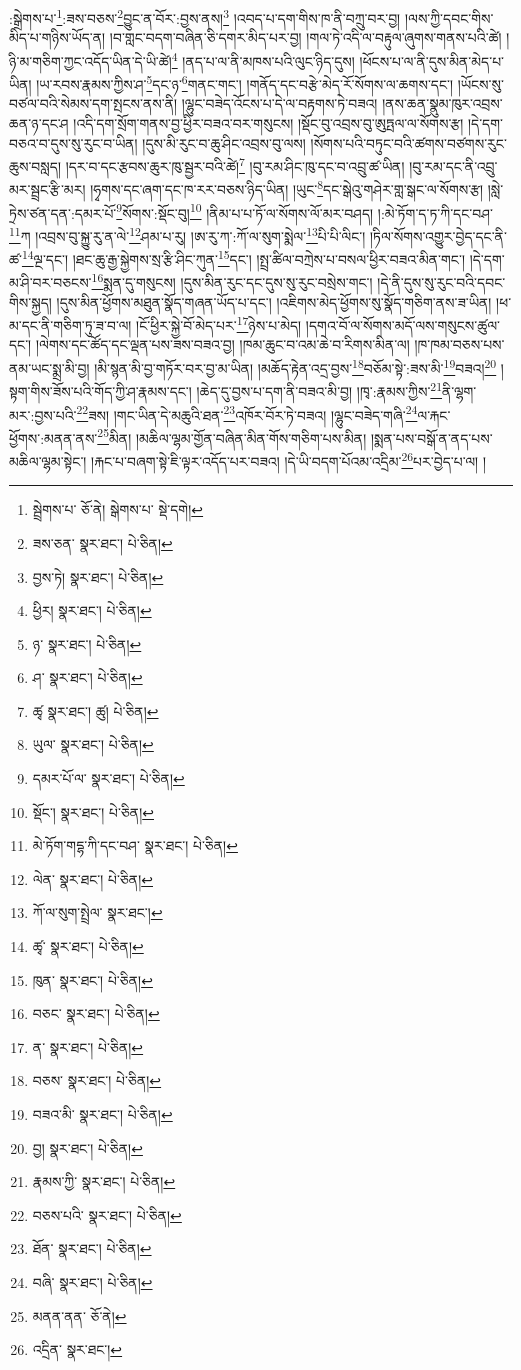 :སྒྲེགས་པ་\footnote{སྦྲེགས་པ་  ཅོ་ནེ། སྒེགས་པ་  སྡེ་དགེ། }:ཟས་བཅས་\footnote{ཟས་ཅན་  སྣར་ཐང་།  པེ་ཅིན། }བྱུང་ན་བོར་:བྱས་ནས།\footnote{བྱས་ཏེ།  སྣར་ཐང་།  པེ་ཅིན། } །འབད་པ་དག་གིས་ཁ་ནི་བཀྲུ་བར་བྱ། །ལས་ཀྱི་དབང་གིས་མིད་པ་གཉིས་ཡོད་ན། །བ་གླང་བདག་བཞིན་ཅི་དགར་མིད་པར་བྱ། །གལ་ཏེ་འདི་ལ་བརྟུལ་ཞུགས་གནས་པའི་ཚེ། །ཉི་མ་གཅིག་ཀྱང་འདོད་ཡིན་དེ་ཡི་ཚེ།\footnote{ཕྱིར།  སྣར་ཐང་།  པེ་ཅིན། } །ནད་པ་ལ་ནི་མཁས་པའི་ལུང་ཉིད་དུས། །ཕོངས་པ་ལ་ནི་དུས་མིན་མེད་པ་ཡིན། །ཡ་རབས་རྣམས་ཀྱིས་ཤ་\footnote{ཉ་  སྣར་ཐང་།  པེ་ཅིན། }དང་ཉ་\footnote{ཤ་  སྣར་ཐང་།  པེ་ཅིན། }གནང་གང་། །གནོད་དང་བརྩེ་མེད་རོ་སོགས་ལ་ཆགས་དང་། །ཡོངས་སུ་བཙལ་བའི་སེམས་དག་སྤངས་ནས་ནི། །ལྷུང་བཟེད་འོངས་པ་དེ་ལ་བརྟགས་ཏེ་བཟའ། །ནས་ཆན་སྣུམ་ཁུར་འབྲས་ཆན་ཉ་དང་ཤ །འདི་དག་སྲོག་གནས་བྱ་ཕྱིར་བཟའ་བར་གསུངས། །སྡོང་བུ་འབྲས་བུ་ཨུཏྤལ་ལ་སོགས་རྩ། །དེ་དག་བཅའ་བ་དུས་སུ་རུང་བ་ཡིན། །དུས་མི་རུང་བ་ཆུ་ཤིང་འབྲས་བུ་ལས། །སོགས་པའི་བཏུང་བའི་ཚགས་བཙགས་རུང་ཆུས་བསླད། །དར་བ་དང་རྩབས་ཆུར་ཁུ་སྦྱར་བའི་ཚེ།\footnote{ཚྭ  སྣར་ཐང་། ཚུ།  པེ་ཅིན། } །བུ་རམ་ཤིང་ཁུ་དང་བ་འབྲུ་ཚ་ཡིན། །བུ་རམ་དང་ནི་འབྲུ་མར་སྦྲང་རྩི་མར། །ཧྭགས་དང་ཞག་དང་ཁ་རར་བཅས་ཉིད་ཡིན། །ཡུང་\footnote{ཡུལ་  སྣར་ཐང་།  པེ་ཅིན། }དང་སྒེའུ་གཤེར་གླ་སྒང་ལ་སོགས་རྩ། །སླེ་ཏྲེས་ཙན་དན་:དམར་པོ་\footnote{དམར་པོ་ལ་  སྣར་ཐང་།  པེ་ཅིན། }སོགས་:སྡོང་བུ།\footnote{སྡོང་།  སྣར་ཐང་།  པེ་ཅིན། } །ནིམ་པ་པ་ཏོ་ལ་སོགས་ལོ་མར་བཤད། །:མེ་ཏོག་ད་ཏ་ཀི་དང་བཤ་\footnote{མེ་ཏོག་གདྷ་ཀི་དང་བཤ་  སྣར་ཐང་།  པེ་ཅིན། }ཀ །འབྲས་བུ་སྐྱུ་རུ་ན་ལེ་\footnote{ལེན་  སྣར་ཐང་།  པེ་ཅིན། }ཤམ་པ་རུ། །ཨ་རུ་ཀ་:ཀོ་ལ་སུག་སྨེལ་\footnote{ཀོ་ལ་སུག་སྤྲེལ་  སྣར་ཐང་། }པི་པི་ལིང་། །ཏིལ་སོགས་འགྱུར་བྱེད་དང་ནི་ཚ་\footnote{ཚྭ་  སྣར་ཐང་།  པེ་ཅིན། }ལྔ་དང་། །ཐང་ཆུ་རྒྱ་སྐྱེགས་སྲ་རྩི་ཤིང་ཀུན་\footnote{ཁུན་  སྣར་ཐང་།  པེ་ཅིན། }དང་། །སྤྲ་ཚིལ་བཀྲེས་པ་བསལ་ཕྱིར་བཟའ་མིན་གང་། །དེ་དག་མ་ཤི་བར་བཅངས་\footnote{བཅང་  སྣར་ཐང་།  པེ་ཅིན། }སྨན་དུ་གསུངས། །དུས་མིན་རུང་དང་དུས་སུ་རུང་བསྲེས་གང་། །དེ་ནི་དུས་སུ་རུང་བའི་དབང་གིས་སྐྱད། །དུས་མིན་ཕྱོགས་མཐུན་སྣོད་གཞན་ཡོད་པ་དང་། །འཇིགས་མེད་ཕྱོགས་སུ་སྣོད་གཅིག་ནས་ཟ་ཡིན། །ཕ་མ་དང་ནི་གཅིག་ཏུ་ཟ་བ་ལ། །ངོ་ཕྱིར་སྐྱེ་བོ་མེད་པར་\footnote{ན་  སྣར་ཐང་།  པེ་ཅིན། }ཉེས་པ་མེད། །དགའ་བོ་ལ་སོགས་མདོ་ལས་གསུངས་ཚུལ་དང་། །ལེགས་དང་ཚོད་དང་ལྡན་པས་ཟས་བཟའ་བྱ། །ཁམ་ཆུང་བ་འམ་ཆེ་བ་རིགས་མིན་ལ། །ཁ་ཁམ་བཅས་པས་ནམ་ཡང་སྨྲ་མི་བྱ། །མི་སྙན་མི་བྱ་གཏོར་བར་བྱ་མ་ཡིན། །མཆོད་རྟེན་འདྲ་བྱས་\footnote{བཅས་  སྣར་ཐང་།  པེ་ཅིན། }བཅོམ་སྟེ་:ཟས་མི་\footnote{བཟའ་མི་  སྣར་ཐང་།  པེ་ཅིན། }བཟའ།\footnote{བྱ།  སྣར་ཐང་།  པེ་ཅིན། } །སྟག་གིས་ཟོས་པའི་གོད་ཀྱི་ཤ་རྣམས་དང་། །ཆེད་དུ་བྱས་པ་དག་ནི་བཟའ་མི་བྱ། །ཁྭ་:རྣམས་ཀྱིས་\footnote{རྣམས་ཀྱི་  སྣར་ཐང་།  པེ་ཅིན། }ནི་ལྷག་མར་:བྱས་པའི་\footnote{བཅས་པའི་  སྣར་ཐང་།  པེ་ཅིན། }ཟས། །གང་ཡིན་དེ་མཆུའི་ཐན་\footnote{ཐོན་  སྣར་ཐང་།  པེ་ཅིན། }འཁོར་བོར་ཏེ་བཟའ། །ལྷུང་བཟེད་གཞི་\footnote{བཞི་  སྣར་ཐང་།  པེ་ཅིན། }ལ་རྐང་ཕྱོགས་:མནན་ནས་\footnote{མནན་ནན་  ཅོ་ནེ། }མིན། །མཆིལ་ལྷམ་གྱོན་བཞིན་མིན་གོས་གཅིག་པས་མིན། །སྨན་པས་བསྒོ་ན་ནད་པས་མཆིལ་ལྷམ་སྟེང་། །རྐང་པ་བཞག་སྟེ་ཇི་ལྟར་འདོད་པར་བཟའ། །དེ་ཡི་བདག་པོའམ་འདྲིམ་\footnote{འདྲིན་  སྣར་ཐང་། }པར་བྱེད་པ་ལ། །
